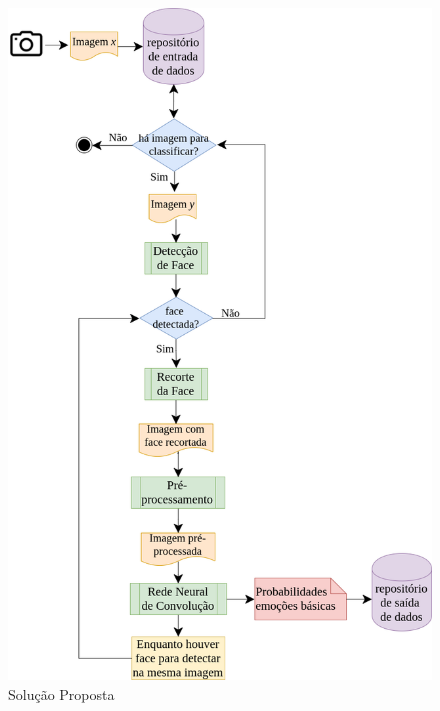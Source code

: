 \begin{figure}
\centering
\includegraphics[scale=0.45]{figuras/arquitetura.png}
\caption{Solução Proposta}
\label{fig:arquitetura2}
\end{figure}

     

